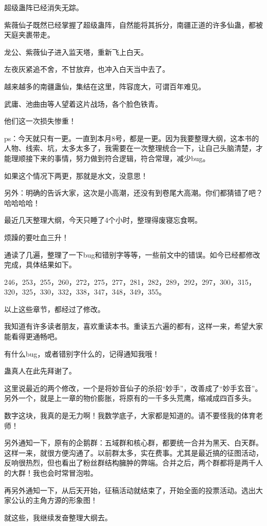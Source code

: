 \begin{this_body}
超级蛊阵已经消失无踪。

紫薇仙子既然已经掌握了超级蛊阵，自然能将其拆分，南疆正道的许多仙蛊，都被天庭夹裹带走。

龙公、紫薇仙子进入监天塔，重新飞上白天。

左夜灰紧追不舍，不甘放弃，也冲入白天当中去了。

越来越多的南疆蛊仙，集结在这里，阵容庞大，可谓百年难见。

武庸、池曲由等人望着这片战场，各个脸色铁青。

他们这一次损失惨重！

ps：今天就只有一更。一直到本月8号，都是一更。因为我要整理大纲，这本书的人物、线索、坑，太多太多了，我需要在一次整理统合一下，让自己头脑清楚，才能理顺接下来的事情，努力做到符合逻辑，符合常理，减少bug。

如果这个情况下两更，那就是水文，没意思！

另外：明确的告诉大家，这次是小高潮，还没有到卷尾大高潮。你们都猜错了吧？哈哈哈哈！

\end{this_body}
\begin{this_body}
最近几天整理大纲，今天只睡了4个小时，整理得废寝忘食啊。

烦躁的要吐血三升！

通读了几遍，整理了一下bug和错别字等等，一些前文中的错误。如今已经都修改完成，具体结果如下。

246，253，255，260，272，275，277，281，282，289，292，297，300，315，320，325，330，332，338，347，348，349，355。

以上这些章节，都经过了修改。

我知道有许多读者朋友，喜欢重读本书。重读五六遍的都有，这样一来，希望大家能看得更通畅吧。

有什么bug，或者错别字什么的，记得通知我哦！

蛊真人在此先拜谢了。

这里说最近的两个修改，一个是将妙音仙子的杀招“妙手”，改善成了“妙手玄音”。另外一个，就是上一章的物价膨胀，将原有的一千多头荒鹰，缩减成四百多头。

数字这块，我真的是无力啊！我数学底子，大家都是知道的。请不要怪我的体育老师！

另外通知一下，原有的企鹅群：五域群和核心群，都要统一合并为黑天、白天群。这样一来，就很方便沟通了。以前群太多，实在费事。尤其是最近搞的征图活动，反响很热烈，但也看出了粉丝群结构臃肿的弊端。合并之后，两个群都将是两千人的大群！我也会时常冒泡啦。

再另外通知一下，从后天开始，征稿活动就结束了，开始全面的投票活动。选出大家公认的主角方源的形象图！

就这些，我继续发奋整理大纲去。

\end{this_body}

